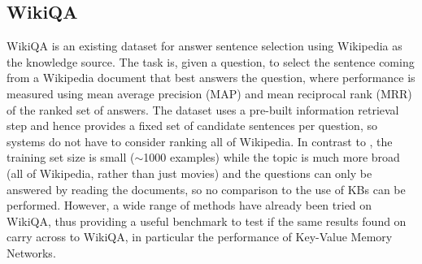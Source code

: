 \begin{table}[t!]
	\begin{center}
    	\caption{
	\label{tab:wikiqares}
              { Test results on WikiQA.}}
  	\end{center}
\end{table}


\subsection{WikiQA} \label{sec:wikiqa}

{\sc WikiQA} \citep{yang2015wikiqa} is an existing dataset for answer sentence selection
using Wikipedia as the knowledge source. The task is, given a question, to select
the sentence coming from a Wikipedia document that best answers the question,
where performance is measured using mean average precision (MAP) and mean reciprocal rank (MRR)
of the ranked set of answers. The dataset uses a pre-built
information retrieval step and hence provides a fixed set of candidate sentences per question,
 so systems do not have to consider ranking all of Wikipedia.
In contrast to \WikiMovies, the training set size is small ($\sim$1000 examples) while
the topic is much more broad (all of Wikipedia, rather than just movies) and the
questions can only be answered by reading the documents, so no comparison to the use
of KBs can be performed. However, a wide range of methods have already been tried on
{\sc WikiQA}, thus providing a useful benchmark to test if the same results
found on \WikiMovies carry across to {\sc WikiQA}, in particular the performance
of Key-Value Memory Networks.


